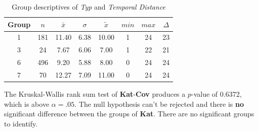 \begin{table}[ht]
	\small
	\centering
    \begin{tabular}{c|c|c|c|c|c|c|c}
        \toprule
        Group & $n$ & $\bar{x}$ & $\sigma$ & $\tilde{x}$ & $min$ & $max$ & $\Delta$ \\
        \midrule
        1 & 181 & 11.40 & 6.38 & 10.00 & 1  & 24 & 23 \\ 
        3 & 24  & 7.67  & 6.06 & 7.00  & 1  & 22 & 21 \\ 
        6 & 496 & 9.20  & 5.88 & 8.00  & 0  & 24 & 24 \\ 
        7 & 70  & 12.27 & 7.09 & 11.00 & 0  & 24 & 24 \\ 
        \bottomrule
    \end{tabular}
    \caption{Group descriptives of \textit{Typ} and \textit{Temporal Distance}}
    \label{tbl:descriptives_baysis_initiator_Typ_TDist}
\end{table}

The Kruskal-Wallis rank sum test of \textbf{Kat}-\textbf{Cov} produces a $p$-value of 0.6372, which is above $\alpha=.05$. The null hypothesis can't be rejected and there is \textbf{no} significant difference between the groups of \textbf{Kat}. There are no significant groups to identify.

